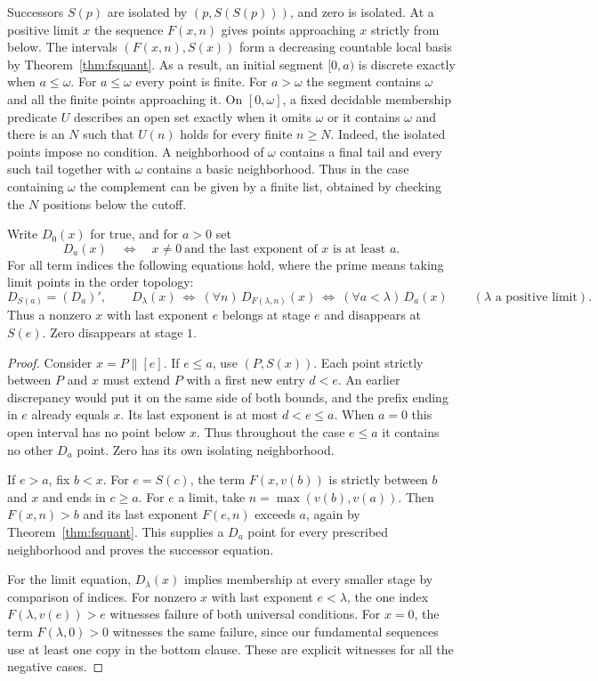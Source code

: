 Successors $S(p)$ are isolated by $(p,S(S(p)))$, and zero is isolated.
At a positive limit $x$ the sequence $F(x,n)$ gives points approaching
$x$ strictly from below. The intervals $(F(x,n),S(x))$ form a
decreasing countable local basis by Theorem~\ref{thm:fsquant}. As a
result, an initial segment $[0,a)$ is discrete exactly when
$a\le\omega$. For $a\le\omega$ every point is finite. For $a>\omega$
the segment contains $\omega$ and all the finite points approaching it.
On $[0,\omega]$, a fixed decidable membership predicate $U$ describes
an open set exactly when it omits $\omega$ or it contains $\omega$ and
there is an $N$ such that $U(n)$ holds for every finite $n\ge N$.
Indeed, the isolated points impose no condition. A neighborhood of
$\omega$ contains a final tail and every such tail together with
$\omega$ contains a basic neighborhood. Thus in the case containing
$\omega$ the complement can be given by a finite list, obtained by
checking the $N$ positions below the cutoff.

\begin{theorem}
Write $D_0(x)$ for true, and for $a>0$ set
\[
       D_a(x)\quad\Longleftrightarrow\quad
       x\ne0\ \text{and the last exponent of }x\text{ is at least }a.
\]
For all term indices the following equations hold, where the prime
means taking limit points in the order topology:
\[
 D_{S(a)}=(D_a)',\qquad
 D_\lambda(x)\ \Longleftrightarrow\ (\forall n)\,D_{F(\lambda,n)}(x)
 \ \Longleftrightarrow\
 (\forall a<\lambda)\,D_a(x)\qquad(\lambda\text{ a positive limit}).
\]
Thus a nonzero $x$ with last exponent $e$ belongs at stage $e$ and
disappears at $S(e)$. Zero disappears at stage $1$.
\end{theorem}
\begin{proof}
Consider $x=P\mathbin{\|}[e]$. If $e\le a$, use $(P,S(x))$.
Each point strictly between $P$ and $x$ must extend $P$ with a
first new entry $d<e$. An earlier discrepancy would put it on the
same side of both bounds, and the prefix ending in $e$ already equals
$x$. Its last exponent is at most $d<e\le a$.
When $a=0$ this open interval has no point below $x$. Thus throughout
the case $e\le a$ it contains no other $D_a$ point.
Zero has its own isolating neighborhood.

If $e>a$, fix $b<x$. For $e=S(c)$, the term $F(x,v(b))$ is strictly
between $b$ and $x$ and ends in $c\ge a$. For $e$ a limit, take
$n=\max(v(b),v(a))$. Then $F(x,n)>b$ and its last exponent $F(e,n)$
exceeds $a$, again by Theorem~\ref{thm:fsquant}. This supplies a
$D_a$ point for every prescribed neighborhood and proves the successor
equation.

For the limit equation, $D_\lambda(x)$ implies membership at every
smaller stage by comparison of indices. For nonzero $x$ with last
exponent $e<\lambda$, the one index $F(\lambda,v(e))>e$ witnesses
failure of both universal conditions. For $x=0$, the term
$F(\lambda,0)>0$ witnesses the same failure, since our fundamental
sequences use at least one copy in the bottom clause. These are
explicit witnesses for all the negative cases.
\end{proof}

